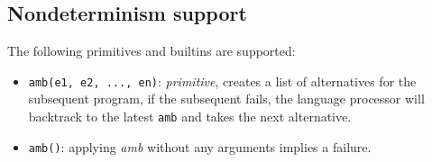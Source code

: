 \subsection*{Nondeterminism support}

The following primitives and builtins are supported:

\begin{itemize}
\item \lstinline{amb(e1, e2, ..., en)}: \textit{primitive}, creates a list of alternatives for the 
subsequent program, if the subsequent fails, the language processor will backtrack to the latest \lstinline{amb}
and takes the next alternative.
\item \lstinline{amb()}: applying \textit{amb} without any arguments implies a failure.
\end{itemize}
